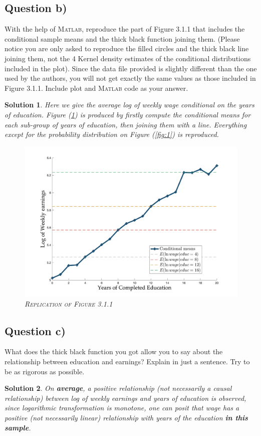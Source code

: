 \documentclass[9pt]{tufte-handout}
\newcommand{\problem}[1]{{\color{gray} #1}}
\newcommand{\solution}[1]{{\color{NavyBlue} #1}}
\newcommand{\qedblack}{\hfill \blacksquare}
\newtheorem*{Solution}{Solution}
\begin{document}
\subsection{Question b)}
\problem{With the help of \textsc{Matlab}, reproduce the part of Figure 3.1.1 that includes the conditional sample means and the thick black function joining them. (Please notice you are only asked to reproduce the filled circles and the thick black line joining them, not the 4 Kernel density estimates of the conditional distributions included in the plot). Since the data file provided is slightly different than the one used by the authors, you will not get exactly the same values as those included in Figure 3.1.1. Include plot and \textsc{Matlab} code as your answer.}
\solution{\begin{Solution}
	\normalfont
	Here we give the average log of weekly wage conditional on the years of education. Figure (\ref{fig:2}) is produced by firstly compute the conditional means for each sub-group of years of education, then joining them with a line. Everything except for the probability distribution on Figure (\ref{fig:1}) is reproduced.
	\begin{figure}
		\includegraphics[scale = 0.18]{1b.png}
		\caption{\textsc{Replication of Figure 3.1.1}}
		\label{fig:2}
	\end{figure}
	\qedblack
\end{Solution}
}

\subsection{Question c)}
\problem{What does the thick black function you got allow you to say about the relationship between education and earnings? Explain in just a sentence. Try to be as rigorous as possible.
}
\solution{\begin{Solution}
	\normalfont
	On \textbf{average}, a positive relationship (\textit{not} necessarily a \textit{causal} relationship) between log of weekly earnings and years of education is observed, since logarithmic transformation is monotone, one can posit that wage has a positive (\textit{not} necessarily \textit{linear}) relationship with years of the education \textbf{in this sample}.
	\qedblack
\end{Solution}
}
\end{document}
